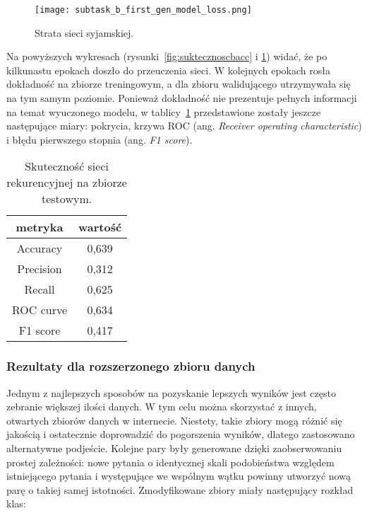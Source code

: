 \begin{figure}[H]
\caption{Strata sieci syjamskiej.\label{fig:suktecznoscbloss}}
\centering
\texttt{[image: subtask\_b\_first\_gen\_model\_loss.png]}
\end{figure}

Na powyższych wykresach (rysunki~\ref{fig:suktecznoscbacc} i \ref{fig:suktecznoscbloss}) widać, że po kilkunastu epokach doszło do przeuczenia sieci. W kolejnych epokach rosła dokładność na zbiorze treningowym, a dla zbioru walidującego utrzymywała się na tym samym poziomie. Ponieważ dokładność nie prezentuje pełnych informacji na temat wyuczonego modelu, w tablicy~\ref{tab:train_set_statistics_score_tableb}  przedstawione zostały jeszcze następujące miary: pokrycia, krzywa ROC (ang. \textit{Receiver operating characteristic}) i błędu pierwszego stopnia (ang. \textit{F1 score}).

\begin{table}[H]
\caption{Skuteczność sieci rekurencyjnej na zbiorze testowym.}
\label{tab:train_set_statistics_score_tableb}
    \begin{center}
        \begin{tabular}{ |c|c| } 
            \hline
            metryka & wartość\\
            \hline
            Accuracy & 0,639 \\
            \hline
            Precision & 0,312 \\
            \hline
            Recall & 0,625 \\ 
            \hline
            ROC curve & 0,634 \\ 
            \hline
            F1 score & 0,417 \\ 
            \hline
        \end{tabular}
    \end{center}
\end{table}

\subsubsection{Rezultaty dla rozszerzonego zbioru danych}

Jednym z najlepszych sposobów na pozyskanie lepszych wyników jest często zebranie większej ilości danych. W tym celu można skorzystać z innych, otwartych zbiorów danych w internecie. Niestety, takie zbiory mogą różnić się jakością i ostatecznie doprowadzić do pogorszenia wyników, dlatego zastosowano alternatywne podjeście. Kolejne pary były generowane dzięki zaobserwowaniu prostej zależności: nowe pytania o identycznej skali podobieństwa względem istniejącego pytania i występujące we wspólnym wątku powinny utworzyć nową parę o takiej samej istotności.
Zmodyfikowane zbiory miały następujący rozkład klas:

